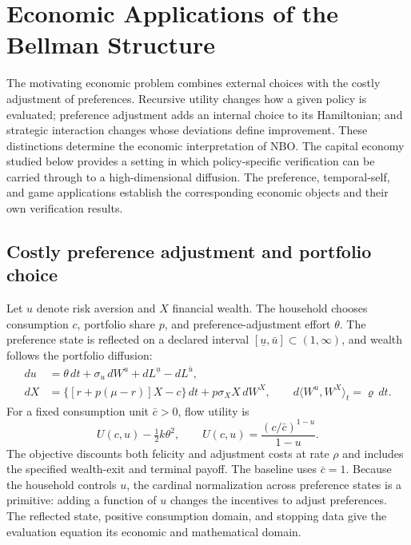 \section{Economic Applications of the Bellman Structure}\label{sec:economic-scope}
The motivating economic problem combines external choices with the costly adjustment of preferences. Recursive utility changes how a given policy is evaluated; preference adjustment adds an internal choice to its Hamiltonian; and strategic interaction changes whose deviations define improvement. These distinctions determine the economic interpretation of NBO. The capital economy studied below provides a setting in which policy-specific verification can be carried through to a high-dimensional diffusion. The preference, temporal-self, and game applications establish the corresponding economic objects and their own verification results.

\subsection{Costly preference adjustment and portfolio choice}
Let $u$ denote risk aversion and $X$ financial wealth. The household chooses consumption $c$, portfolio share $p$, and preference-adjustment effort $\theta$. The preference state is reflected on a declared interval $[\underline u,\bar u]\subset(1,\infty)$, and wealth follows the portfolio diffusion:
\begin{align}
 du&=\theta\,dt+\sigma_u\,dW^u+dL^{\underline u}-dL^{\bar u},\nonumber\\
 dX&=\{[r+p(\mu-r)]X-c\}\,dt+p\sigma_X X\,dW^X,
 \qquad d\langle W^u,W^X\rangle_t=\varrho\,dt.\label{eq:scope-preferences}
\end{align}
For a fixed consumption unit $\bar c>0$, flow utility is
\[
 U(c,u)-\tfrac12k\theta^2,
 \qquad U(c,u)=\frac{(c/\bar c)^{1-u}}{1-u}.
\]
The objective discounts both felicity and adjustment costs at rate $\rho$ and includes the specified wealth-exit and terminal payoff. The baseline uses $\bar c=1$. Because the household controls $u$, the cardinal normalization across preference states is a primitive: adding a function of $u$ changes the incentives to adjust preferences. The reflected state, positive consumption domain, and stopping data give the evaluation equation its economic and mathematical domain.

